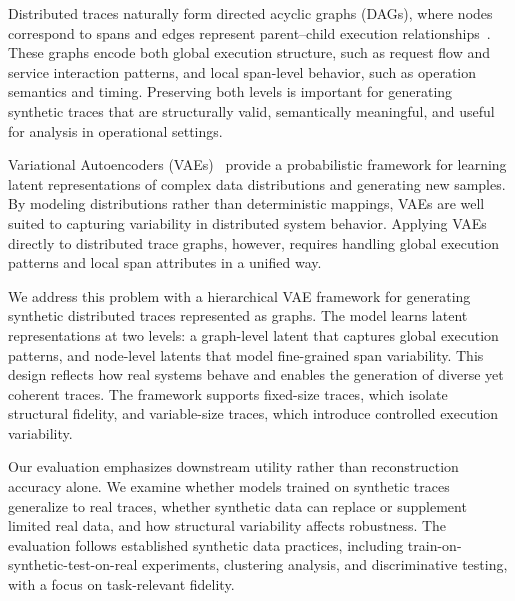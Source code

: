 \documentclass[sigconf,review]{acmart}
\begin{document}
Distributed traces naturally form directed acyclic graphs (DAGs), where nodes correspond to spans and edges represent parent--child execution relationships~\cite{sigelman2010dapper}. These graphs encode both global execution structure, such as request flow and service interaction patterns, and local span-level behavior, such as operation semantics and timing. Preserving both levels is important for generating synthetic traces that are structurally valid, semantically meaningful, and useful for analysis in operational settings.

Variational Autoencoders (VAEs)~\cite{kingma2013auto,hamilton2020graph} provide a probabilistic framework for learning latent representations of complex data distributions and generating new samples. By modeling distributions rather than deterministic mappings, VAEs are well suited to capturing variability in distributed system behavior. Applying VAEs directly to distributed trace graphs, however, requires handling global execution patterns and local span attributes in a unified way.

We address this problem with a hierarchical VAE framework for generating synthetic distributed traces represented as graphs. The model learns latent representations at two levels: a graph-level latent that captures global execution patterns, and node-level latents that model fine-grained span variability. This design reflects how real systems behave and enables the generation of diverse yet coherent traces. The framework supports fixed-size traces, which isolate structural fidelity, and variable-size traces, which introduce controlled execution variability.

Our evaluation emphasizes downstream utility rather than reconstruction accuracy alone. We examine whether models trained on synthetic traces generalize to real traces, whether synthetic data can replace or supplement limited real data, and how structural variability affects robustness. The evaluation follows established synthetic data practices, including train-on-synthetic-test-on-real experiments, clustering analysis, and discriminative testing, with a focus on task-relevant fidelity.
\end{document}
